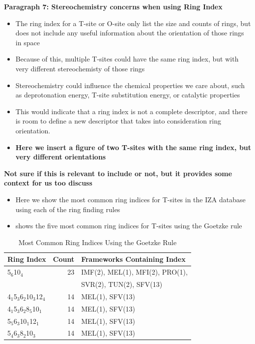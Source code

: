 \documentclass[11pt]{article}
\begin{document}
\textbf{\textbf{Paragraph 7: Stereochemistry concerns when using Ring Index}}
\begin{itemize}
\item The ring index for a T-site or O-site only list the size and counts of rings, but does not include any useful information about the orientation of those rings in space
\item Because of this, multiple T-sites could have the same ring index, but with very different stereochemisty of those rings
\item Stereochemistry could influence the chemical properties we care about, such as deprotonation energy, T-site substitution energy, or catalytic properties
\item This would indicate that a ring index is not a complete descriptor, and there is room to define a new descriptor that takes into consideration ring orientation.
\item \textbf{\textbf{Here we insert a figure of two T-sites with the same ring index, but very different orientations}}
\end{itemize}

\textbf{\textbf{Not sure if this is relevant to include or not, but it provides some context for us too discuss}}
\begin{itemize}
\item Here we show the most common ring indices for T-sites in the IZA database using each of the ring finding rules
\item {} shows the five most common ring indices for T-sites using the Goetzke  rule
\end{itemize}
\begin{table}[htbp]
\caption{Most Common Ring Indices Using the Goetzke Rule \label{tab:goetzke-ts}}
\centering
\begin{tabular}{lrl}
Ring Index & Count & Frameworks Containing Index\\
\hline
5\(_{\text{6}}\)\textbullet{}10\(_{\text{4}}\) & 23 & IMF(2), MEL(1), MFI(2), PRO(1),\\
 &  & SVR(2), TUN(2), SFV(13)\\
4\(_{\text{1}}\)\textbullet{}5\(_{\text{3}}\)\textbullet{}6\(_{\text{2}}\)\textbullet{}10\(_{\text{3}}\)\textbullet{}12\(_{\text{4}}\) & 14 & MEL(1), SFV(13)\\
4\(_{\text{1}}\)\textbullet{}5\(_{\text{3}}\)\textbullet{}6\(_{\text{2}}\)\textbullet{}8\(_{\text{5}}\)\textbullet{}10\(_{\text{1}}\) & 14 & MEL(1), SFV(13)\\
5\(_{\text{5}}\)\textbullet{}6\(_{\text{3}}\)\textbullet{}10\(_{\text{1}}\)\textbullet{}12\(_{\text{1}}\) & 14 & MEL(1), SFV(13)\\
5\(_{\text{4}}\)\textbullet{}6\(_{\text{3}}\)\textbullet{}8\(_{\text{2}}\)\textbullet{}10\(_{\text{3}}\) & 14 & MEL(1), SFV(13)\\
\end{tabular}
\end{table}
\end{document}
